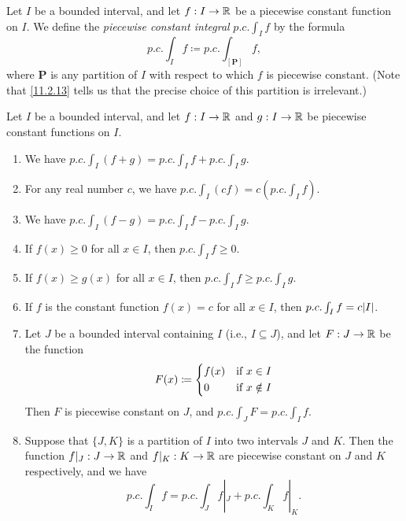 \begin{defn}\label{11.2.14}
  Let \(I\) be a bounded interval, and let \(f : I \to \mathbb{R}\) be a piecewise constant function on \(I\).
  We define the \emph{piecewise constant integral} \(p.c. \int_I f\) by the formula
  \[
    p.c. \int_I f \coloneqq p.c. \int_{[\mathbf{P}]} f,
  \]
  where \(\mathbf{P}\) is any partition of \(I\) with respect to which \(f\) is piecewise constant.
  (Note that \cref{11.2.13} tells us that the precise choice of this partition is irrelevant.)
\end{defn}

\setcounter{thm}{15}
\begin{thm}\label{11.2.16}
  Let \(I\) be a bounded interval, and let \(f : I \to \mathbb{R}\) and \(g : I \to \mathbb{R}\) be piecewise constant functions on \(I\).
  \begin{enumerate}
    \item We have \(p.c. \int_I (f + g) = p.c. \int_I f + p.c. \int_I g\).
    \item For any real number \(c\), we have \(p.c. \int_I (cf) = c (p.c. \int_I f)\).
    \item We have \(p.c. \int_I (f - g) = p.c. \int_I f - p.c. \int_I g\).
    \item If \(f(x) \geq 0\) for all \(x \in I\), then \(p.c. \int_I f \geq 0\).
    \item If \(f(x) \geq g(x)\) for all \(x \in I\), then \(p.c. \int_I f \geq p.c. \int_I g\).
    \item If \(f\) is the constant function \(f(x) = c\) for all \(x \in I\), then \(p.c. \int_I f = c \abs{I}\).
    \item Let \(J\) be a bounded interval containing \(I\) (i.e., \(I \subseteq J\)), and let \(F : J \to \mathbb{R}\) be the function
          \[
            F(x) \coloneqq \begin{dcases}
              f(x) & \text{if } x \in I    \\
              0    & \text{if } x \notin I
            \end{dcases}
          \]
          Then \(F\) is piecewise constant on \(J\), and \(p.c. \int_J F = p.c. \int_I f\).
    \item Suppose that \(\{J, K\}\) is a partition of \(I\) into two intervals \(J\) and \(K\).
          Then the function \(f|_J : J \to \mathbb{R}\) and \(f|_K : K \to \mathbb{R}\) are piecewise constant on \(J\) and \(K\) respectively, and we have
          \[
            p.c. \int_I f = p.c. \int_J f|_J + p.c. \int_K f|_K.
          \]
  \end{enumerate}
\end{thm}

